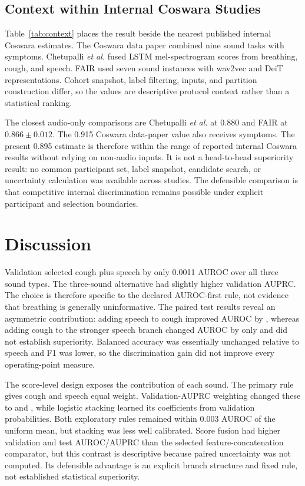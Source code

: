 \documentclass[conference]{IEEEtran}
\begin{document}
\subsection{Context within Internal Coswara Studies}

Table~\ref{tab:context} places the result beside the nearest published
internal Coswara estimates. The Coswara data paper combined nine sound tasks
with symptoms. Chetupalli \emph{et al.} fused LSTM mel-spectrogram scores from
breathing, cough, and speech. FAIR used seven sound instances with wav2vec and
DeiT representations. Cohort snapshot, label filtering, inputs, and partition
construction differ, so the values are descriptive protocol context rather
than a statistical ranking.

The closest audio-only comparisons are Chetupalli \emph{et al.} at 0.880 and
FAIR at $0.866\pm0.012$. The 0.915 Coswara data-paper value also receives
symptoms. The present 0.895 estimate is therefore within the range of reported
internal Coswara results without relying on non-audio inputs. It is not a
head-to-head superiority result: no common participant set, label snapshot,
candidate search, or uncertainty calculation was available across studies.
The defensible comparison is that competitive internal discrimination remains
possible under explicit participant and selection boundaries.

\section{Discussion}

Validation selected cough plus speech by only 0.0011 AUROC over all three sound
types. The three-sound alternative had slightly higher validation AUPRC. The
choice is therefore specific to the declared AUROC-first rule, not evidence that
breathing is generally uninformative. The paired test results reveal an
asymmetric contribution: adding speech to cough improved AUROC by
\FusionMinusCoughAUROC{}, whereas adding cough to the stronger speech branch
changed AUROC by only \FusionMinusSpeechAUROC{} and did not establish
superiority. Balanced accuracy was essentially unchanged relative to speech and
F1 was lower, so the discrimination gain did not improve every operating-point
measure.

The score-level design exposes the contribution of each sound. The primary rule
gives cough and speech equal weight. Validation-AUPRC weighting changed these to
\CoughFusionWeight{} and \SpeechFusionWeight{}, while logistic stacking learned
its coefficients from validation probabilities. Both exploratory rules remained
within 0.003 AUROC of the uniform mean, but stacking was less well calibrated.
Score fusion had higher validation and test AUROC/AUPRC than the selected
feature-concatenation comparator, but this contrast is descriptive because
paired uncertainty was not computed. Its defensible advantage is an explicit
branch structure and fixed rule, not established statistical superiority.
\end{document}
